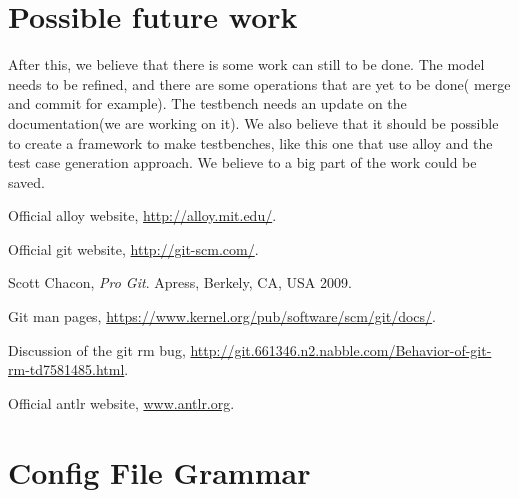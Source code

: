 \chapter{Possible future work}

After this, we believe that there is some work can still to be done. The model needs to be refined, and there are some operations that are yet to be done( merge and commit for example). The testbench needs an update on the documentation(we are working on it).
We also believe that it should be possible to create a framework to make testbenches, like this one that use alloy and the test case generation approach. We believe to a big part of the work could be saved.

\begin{thebibliography}{9}

  Official alloy website, \href{http://alloy.mit.edu/}{http://alloy.mit.edu/}.

	Official git website, \href{http://git-scm.com/}{http://git-scm.com/}.


  Scott Chacon,
  \emph{Pro Git}.
  Apress, Berkely, CA, USA
  2009.
  
	Git man pages, \href{https://www.kernel.org/pub/software/scm/git/docs/}{https://www.kernel.org/pub/software/scm/git/docs/}.


Discussion of the git rm bug, \href{http://git.661346.n2.nabble.com/Behavior-of-git-rm-td7581485.html}{http://git.661346.n2.nabble.com/Behavior-of-git-rm-td7581485.html}.

Official antlr website, \href{www.antlr.org}{www.antlr.org}.

\end{thebibliography}

\appendix
\cleardoublepage
{}
{}

\chapter{Config File Grammar}


